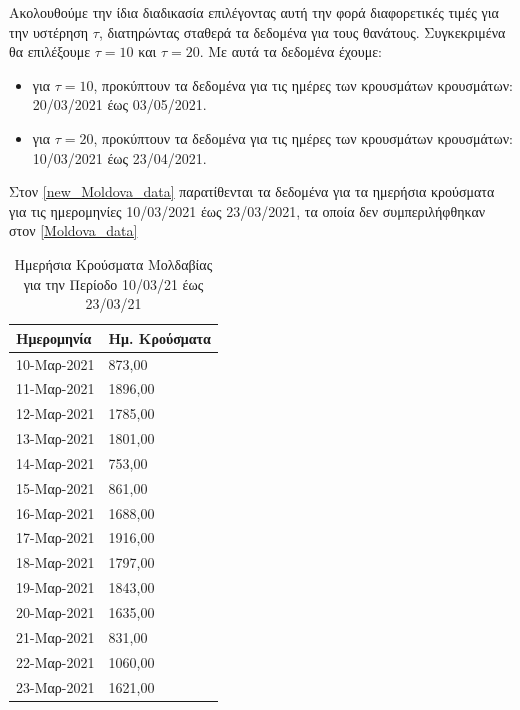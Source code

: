 \documentclass{article}
\begin{document}
Ακολουθούμε την ίδια διαδικασία επιλέγοντας αυτή την φορά διαφορετικές τιμές για την υστέρηση $ \tau $, διατηρώντας σταθερά τα δεδομένα για τους θανάτους. Συγκεκριμένα θα επιλέξουμε $ \tau = 10 $ και $\tau = 20$. Με αυτά τα δεδομένα έχουμε:

\begin{itemize}
    \item για $ \tau = 10 $, προκύπτουν τα δεδομένα για τις ημέρες των κρουσμάτων κρουσμάτων: 20/03/2021 έως 03/05/2021.
    \item για $ \tau = 20 $, προκύπτουν τα δεδομένα για τις ημέρες των κρουσμάτων κρουσμάτων: 10/03/2021 έως 23/04/2021.
\end{itemize}

Στον \autoref{new_Moldova_data} παρατίθενται τα δεδομένα για τα ημερήσια κρούσματα για τις ημερομηνίες 10/03/2021 έως 23/03/2021, τα οποία δεν συμπεριλήφθηκαν στον \autoref{Moldova_data}

\begin{table}
    \centering
    \caption{Ημερήσια Κρούσματα Μολδαβίας για την Περίοδο 10/03/21 έως 23/03/21}
    \begin{tabular}{|l|l|}
    \hline
        Ημερομηνία & Ημ. Κρούσματα \\ \hline
        10-Μαρ-2021 & 873,00 \\ \hline
        11-Μαρ-2021 & 1896,00 \\ \hline
        12-Μαρ-2021 & 1785,00 \\ \hline
        13-Μαρ-2021 & 1801,00 \\ \hline
        14-Μαρ-2021 & 753,00 \\ \hline
        15-Μαρ-2021 & 861,00 \\ \hline
        16-Μαρ-2021 & 1688,00 \\ \hline
        17-Μαρ-2021 & 1916,00 \\ \hline
        18-Μαρ-2021 & 1797,00 \\ \hline
        19-Μαρ-2021 & 1843,00 \\ \hline
        20-Μαρ-2021 & 1635,00 \\ \hline
        21-Μαρ-2021 & 831,00 \\ \hline
        22-Μαρ-2021 & 1060,00 \\ \hline
        23-Μαρ-2021 & 1621,00 \\ \hline
    \end{tabular}
    \label{new_Moldova_data}
\end{table}
\end{document}
